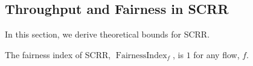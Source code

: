 





\subsection{Throughput and Fairness in SCRR}
\label{sec:fairness-start}
In this section, we derive theoretical bounds for SCRR.

\begin{theorem}
    The fairness index of SCRR, $\operatorname{FairnessIndex}_f$, is $1$ for any flow, $f$.
\end{theorem}

